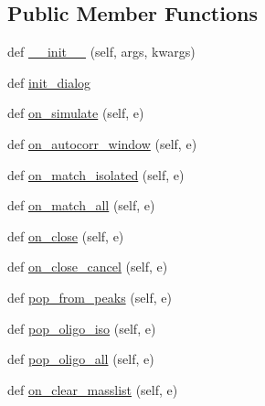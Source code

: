 \subsection*{Public Member Functions}
\begin{DoxyCompactItemize}
\item 
def \hyperlink{class_uni_dec_1_1unidec__modules_1_1masstools_1_1_mass_selection_a3fbe49a10061b8e2ae68b1a4ccf2264b}{\+\_\+\+\_\+init\+\_\+\+\_\+} (self, args, kwargs)
\item 
def \hyperlink{class_uni_dec_1_1unidec__modules_1_1masstools_1_1_mass_selection_a836089133846e57a1211793f0df2f5de}{init\+\_\+dialog}
\item 
def \hyperlink{class_uni_dec_1_1unidec__modules_1_1masstools_1_1_mass_selection_a1fdc472becb711d283c6557b381c3f94}{on\+\_\+simulate} (self, e)
\item 
def \hyperlink{class_uni_dec_1_1unidec__modules_1_1masstools_1_1_mass_selection_a3c12c46dedf9f91dfbf73cf1acf427b0}{on\+\_\+autocorr\+\_\+window} (self, e)
\item 
def \hyperlink{class_uni_dec_1_1unidec__modules_1_1masstools_1_1_mass_selection_a1ac94a8ccc3ff59991eceee3453ff46c}{on\+\_\+match\+\_\+isolated} (self, e)
\item 
def \hyperlink{class_uni_dec_1_1unidec__modules_1_1masstools_1_1_mass_selection_adc587702bf4341d05ea8e215736e63e9}{on\+\_\+match\+\_\+all} (self, e)
\item 
def \hyperlink{class_uni_dec_1_1unidec__modules_1_1masstools_1_1_mass_selection_a08a0f5e62b1bdea73e315235f244c826}{on\+\_\+close} (self, e)
\item 
def \hyperlink{class_uni_dec_1_1unidec__modules_1_1masstools_1_1_mass_selection_a5823fe290058e90d73b45a1f31664147}{on\+\_\+close\+\_\+cancel} (self, e)
\item 
def \hyperlink{class_uni_dec_1_1unidec__modules_1_1masstools_1_1_mass_selection_afbe1c76cbdcad1fb5e48823cd1ae8131}{pop\+\_\+from\+\_\+peaks} (self, e)
\item 
def \hyperlink{class_uni_dec_1_1unidec__modules_1_1masstools_1_1_mass_selection_af536684dd86cd5e0840c6b642da9a515}{pop\+\_\+oligo\+\_\+iso} (self, e)
\item 
def \hyperlink{class_uni_dec_1_1unidec__modules_1_1masstools_1_1_mass_selection_a243d153a48d4bfe7df5da50bb4fed5d4}{pop\+\_\+oligo\+\_\+all} (self, e)
\item 
def \hyperlink{class_uni_dec_1_1unidec__modules_1_1masstools_1_1_mass_selection_a205b3de1867c08b543efdb9432ffc256}{on\+\_\+clear\+\_\+masslist} (self, e)

\end{DoxyCompactItemize}
